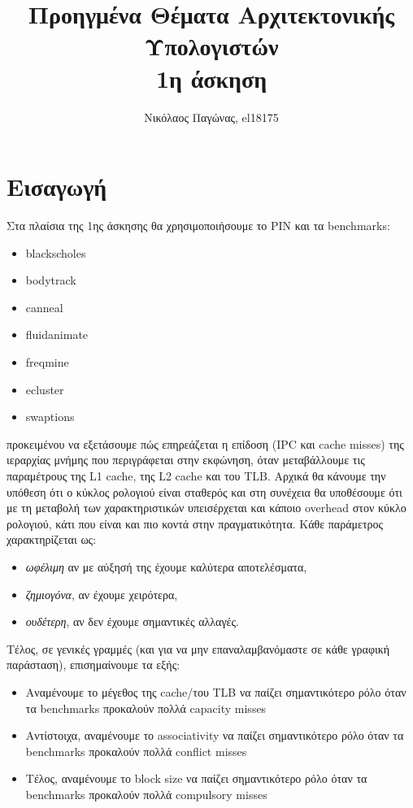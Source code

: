 \documentclass[12pt,a4paper]{article}
\title{Προηγμένα Θέματα Αρχιτεκτονικής Υπολογιστών \\ 1η άσκηση}
\author{Νικόλαος Παγώνας, el18175}
\date{}
\begin{document}
	\maketitle	
	
	\section{Εισαγωγή}	
		Στα πλαίσια της 1ης άσκησης θα χρησιμοποιήσουμε το PIN και τα benchmarks:
		
		\begin{itemize}
			\item blackscholes
			\item bodytrack
			\item canneal
			\item fluidanimate
			\item freqmine
			\item ecluster
			\item swaptions
		\end{itemize}
	
		προκειμένου να εξετάσουμε πώς επηρεάζεται η επίδοση (IPC και cache misses) της ιεραρχίας μνήμης που περιγράφεται στην εκφώνηση, όταν μεταβάλλουμε τις παραμέτρους της L1 cache, της L2 cache και του TLB. Αρχικά θα κάνουμε την υπόθεση ότι ο κύκλος ρολογιού είναι σταθερός και στη συνέχεια θα υποθέσουμε ότι με τη μεταβολή των χαρακτηριστικών υπεισέρχεται και κάποιο overhead στον κύκλο ρολογιού, κάτι που είναι και πιο κοντά στην πραγματικότητα. Κάθε παράμετρος χαρακτηρίζεται ως:
		
		\begin{itemize}
			\item \emph{ωφέλιμη} αν με αύξησή της έχουμε καλύτερα αποτελέσματα,
			\item \emph{ζημιογόνα}, αν έχουμε χειρότερα,
			\item \emph{ουδέτερη}, αν δεν έχουμε σημαντικές αλλαγές.
		\end{itemize}   
	
		Τέλος, σε γενικές γραμμές (και για να μην επαναλαμβανόμαστε σε κάθε γραφική παράσταση), επισημαίνουμε τα εξής:
		
		\begin{itemize}
			\item Αναμένουμε το μέγεθος της cache/του TLB να παίζει σημαντικότερο ρόλο όταν τα benchmarks προκαλούν πολλά capacity misses
			\item Αντίστοιχα, αναμένουμε το associativity να παίζει σημαντικότερο ρόλο όταν τα benchmarks προκαλούν πολλά conflict misses
			\item Τέλος, αναμένουμε το block size να παίζει σημαντικότερο ρόλο όταν τα benchmarks προκαλούν πολλά compulsory misses
		\end{itemize}
\end{document}
